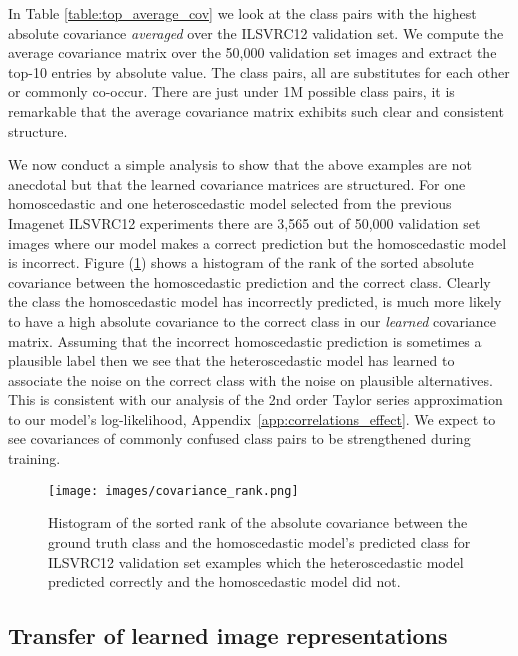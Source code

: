 \documentclass[final]{cvpr}
\begin{document}
In Table \ref{table:top_average_cov} we look at the class pairs with the highest absolute covariance \textit{averaged} over the ILSVRC12 validation set. We compute the average covariance matrix over the 50,000 validation set images and extract the top-10 entries by absolute value. The class pairs, all are substitutes for each other or commonly co-occur. There are just under 1M possible class pairs, it is remarkable that the average covariance matrix exhibits such clear and consistent structure.

We now conduct a simple analysis to show that the above examples are not anecdotal but that the learned covariance matrices are structured. For one homoscedastic and one heteroscedastic model selected from the previous Imagenet ILSVRC12 experiments there are 3,565 out of 50,000 validation set images where our model makes a correct prediction but the homoscedastic model is incorrect. Figure (\ref{fig:covariance_rank}) shows a histogram of the rank of the sorted absolute covariance between the homoscedastic prediction and the correct class. Clearly the class the homoscedastic model has incorrectly predicted, is much more likely to have a high absolute covariance to the correct class in our \textit{learned} covariance matrix. Assuming that the incorrect homoscedastic prediction is sometimes a plausible label then we see that the heteroscedastic model has learned to associate the noise on the correct class with the noise on plausible alternatives. This is consistent with our analysis of the 2nd order Taylor series approximation to our model's log-likelihood, Appendix~\ref{app:correlations_effect}. We expect to see covariances of commonly confused class pairs to be strengthened during training.

\begin{figure}
    \centering
    \texttt{[image: images/covariance\_rank.png]}
    \caption{Histogram of the sorted rank of the absolute covariance between the ground truth class and the homoscedastic model's predicted class for ILSVRC12 validation set examples which the heteroscedastic model predicted correctly and the homoscedastic model did not.}
    \label{fig:covariance_rank}
\end{figure}


\subsection{Transfer of learned image representations}
\label{sec:rep_learning}
\end{document}
